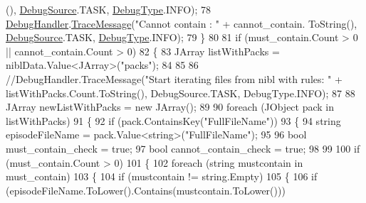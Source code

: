 \begin{DoxyCode}
      (), \mbox{\hyperlink{namespace_little_weeb_library_1_1_handlers_a2a6ca0775121c9c503d58aa254d292be}{DebugSource}}.TASK, \mbox{\hyperlink{namespace_little_weeb_library_1_1_handlers_ab66019ed40462876ec4e61bb3ccb0a62}{DebugType}}.INFO);
78                 \mbox{\hyperlink{class_little_weeb_library_1_1_handlers_1_1_anime_rule_handler_a6ad89134d97d818f3b2deebb7e2cf361}{DebugHandler}}.\mbox{\hyperlink{interface_little_weeb_library_1_1_handlers_1_1_i_debug_handler_a2e405bc3492e683cd3702fae125221bc}{TraceMessage}}(\textcolor{stringliteral}{"Cannot contain : "} + cannot\_contain.
      ToString(), \mbox{\hyperlink{namespace_little_weeb_library_1_1_handlers_a2a6ca0775121c9c503d58aa254d292be}{DebugSource}}.TASK, \mbox{\hyperlink{namespace_little_weeb_library_1_1_handlers_ab66019ed40462876ec4e61bb3ccb0a62}{DebugType}}.INFO);
79             \}
80 
81             \textcolor{keywordflow}{if} (must\_contain.Count > 0 || cannot\_contain.Count > 0)
82             \{
83                 JArray listWithPacks = niblData.Value<JArray>(\textcolor{stringliteral}{"packs"});
84 
85 
86                 \textcolor{comment}{//DebugHandler.TraceMessage("Start iterating files from nibl with rules: " +
       listWithPacks.Count.ToString(), DebugSource.TASK, DebugType.INFO);}
87 
88                 JArray newListWithPacks = \textcolor{keyword}{new} JArray();
89 
90                 \textcolor{keywordflow}{foreach} (JObject pack \textcolor{keywordflow}{in} listWithPacks)
91                 \{
92                     \textcolor{keywordflow}{if} (pack.ContainsKey(\textcolor{stringliteral}{"FullFileName"}))
93                     \{
94                         \textcolor{keywordtype}{string} episodeFileName = pack.Value<\textcolor{keywordtype}{string}>(\textcolor{stringliteral}{"FullFileName"});
95 
96                         \textcolor{keywordtype}{bool} must\_contain\_check = \textcolor{keyword}{true};
97                         \textcolor{keywordtype}{bool} cannot\_contain\_check = \textcolor{keyword}{true};
98 
99 
100                         \textcolor{keywordflow}{if} (must\_contain.Count > 0)
101                         \{
102                             \textcolor{keywordflow}{foreach} (\textcolor{keywordtype}{string} mustcontain \textcolor{keywordflow}{in} must\_contain)
103                             \{
104                                 \textcolor{keywordflow}{if} (mustcontain != \textcolor{keywordtype}{string}.Empty)
105                                 \{
106                                     \textcolor{keywordflow}{if} (episodeFileName.ToLower().Contains(mustcontain.ToLower()))

\end{DoxyCode}

